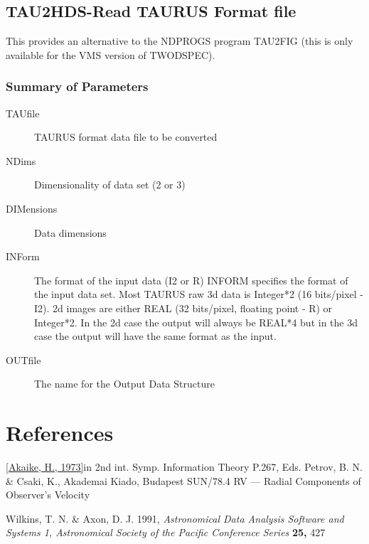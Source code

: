 \subsection{TAU2HDS-Read TAURUS Format file}

This provides an alternative to the NDPROGS program TAU2FIG (this is
only available for the VMS version of TWODSPEC).

\subsubsection{Summary of Parameters}

\begin{description}
\item[TAUfile] TAURUS format data file to be converted
\item[NDims] Dimensionality of data set (2 or 3)
\item[DIMensions] Data dimensions
\item[INForm] The format of the input data (I2 or R)
INFORM specifies the format of the input data set.
Most TAURUS raw 3d data is Integer*2 (16 bits/pixel - I2).
2d images are  either REAL (32 bits/pixel, floating point - R) or
Integer*2.
In the 2d case the output will always be REAL*4 but in the 3d case the
output will have the same format as the input.
\item[OUTfile] The name for the Output Data Structure
\end{description}


\section*{References}

\begin{description}
\cref{Akaike, H., 1973}{in 2nd int. Symp. Information Theory}
{P.267, Eds. Petrov, B. N. \& Csaki, K., Akademai Kiado, Budapest}{} 
{SUN/78.4 RV --- Radial Components of Observer's Velocity}
\item{Wilkins, T. N. \& Axon, D. J. 1991, }{\it Astronomical Data Analysis
Software and Systems 1, Astronomical Society of the Pacific Conference Series }
{\bf 25,}{ 427}
\end{description}

